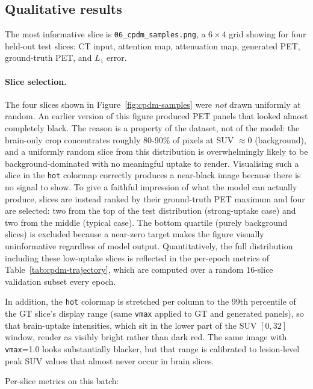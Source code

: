 \documentclass[11pt,a4paper]{article}
\begin{document}
\subsection{Qualitative results}

The most informative slice is \texttt{06\_cpdm\_samples.png}, a $6 \times 4$ 
grid showing for four held-out test slices: CT input, attention map, attenuation map, 
generated PET, ground-truth PET, and $L_1$ error.

\paragraph{Slice selection.} The four slices shown in 
Figure~\ref{fig:cpdm-samples} were \emph{not} drawn uniformly at random. 
An earlier version of this figure 
produced PET panels that looked almost completely black. The reason is a property 
of the dataset, not of the model: the brain-only crop concentrates roughly 80-90\% 
of pixels at SUV $\approx 0$ (background), and a uniformly random slice from this 
distribution is overwhelmingly likely to be background-dominated with no 
meaningful uptake to render. Visualising such a slice in the \texttt{hot} 
colormap correctly produces a near-black image because there is no signal to show. 
To give a faithful impression of what the model can actually produce, slices 
are instead ranked by their ground-truth PET maximum and four are selected: 
two from the top of the test distribution (strong-uptake case) and two from 
the middle (typical case). The bottom quartile (purely background slices) 
is excluded because a near-zero target makes the figure visually uninformative 
regardless of model output. Quantitatively, the full distribution including 
these low-uptake slices is reflected in the per-epoch metrics of 
Table~\ref{tab:cpdm-trajectory}, which are computed over a random 16-slice 
validation subset every epoch.

In addition, the \texttt{hot} colormap is stretched per column to the 99th percentile of 
the GT slice's display range (same \texttt{vmax} applied to GT and generated panels), 
so that brain-uptake intensities, which sit in the lower part of the SUV $[0,32]$ window, 
render as visibly bright rather than dark red. The same image with \texttt{vmax}=1.0 
looks substantially blacker, but that range is calibrated to lesion-level peak 
SUV values that almost never occur in brain slices.

Per-slice metrics on this batch:
\end{document}
